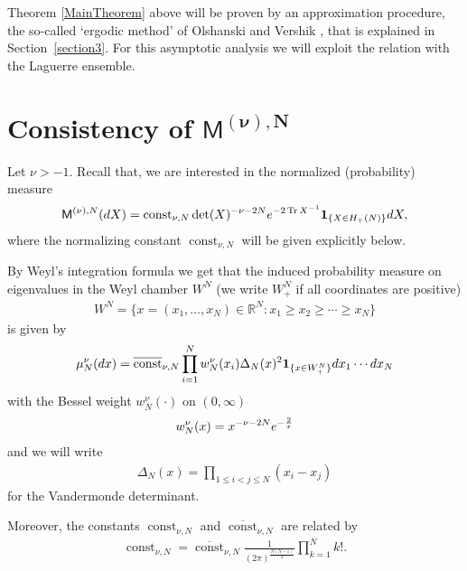 \documentclass[11pt]{article}
\numberwithin{equation}{section}
\begin{document}
Theorem \ref{MainTheorem} above will be proven by an approximation procedure, the so-called `ergodic method' of Olshanski and Vershik \cite{OlshanskiVershik}, that is explained in Section~\ref{section3}. For this asymptotic analysis we will exploit the relation with the Laguerre ensemble.

\setcounter{section}{1}
\setcounter{subsection}{5}
\setcounter{subsubsection}{0}
\setcounter{Theorem}{6}
\setcounter{equation}{4}
\section[Consistency of $\mathsf{M}^{(\nu),N}$]{Consistency of $\boldsymbol{\mathsf{M}^{(\nu),N}}$}\label{section2}

Let $\nu>-1$. Recall that, we are interested in the normalized (probability) measure
\begin{gather*}
\mathsf{M}^{(\nu),N}({\rm d}X)= \operatorname{const}_{\nu, N} \det(X)^{-\nu-2N} {\rm e}^{-2\operatorname{Tr}X^{-1}}\mathbf{1}_{\{X \in H_+(N)\}}{\rm d}X,
\end{gather*}
where the normalizing constant $\operatorname{const}_{\nu, N}$ will be given explicitly below.

By Weyl's integration formula we get that the induced probability measure on eigenvalues in the Weyl chamber $W^N$ (we write $W^N_+$ if all coordinates are positive)
\begin{gather*}
W^N=\big\{x=(x_1,\dots,x_N) \in \mathbb{R}^N\colon x_1 \ge x_2 \ge \cdots \ge x_N \big\}
\end{gather*}
is given by
\begin{gather*}
\mu_N^{\nu}({\rm d}x)=\overline{\operatorname{const}}_{\nu, N}\prod_{i=1}^{N}w_N^{\nu}(x_i)\Delta_N(x)^2\mathbf{1}_{ \{x \in W_+^N \}}{\rm d}x_1\cdots {\rm d}x_N
\end{gather*}
with the Bessel weight $w_N^{\nu}(\cdot)$ on $(0,\infty)$
\begin{gather*}
w_N^{\nu}(x)=x^{-\nu-2N}{\rm e}^{-\frac{2}{x}}
\end{gather*}
and we will write
\begin{gather*}
\Delta_N(x)=\prod_{1 \le i<j \le N}^{}(x_i-x_j)
\end{gather*}
for the Vandermonde determinant.

Moreover, the constants $\operatorname{const}_{\nu, N}$ and $\overline{\operatorname{const}}_{\nu, N}$ are related by
\begin{gather*}
\operatorname{const}_{\nu, N}=\overline{\operatorname{const}}_{\nu, N}\frac{1}{(2\pi)^\frac{N(N-1)}{2}}\prod_{k=1}^{N}k!.
\end{gather*}
\end{document}
